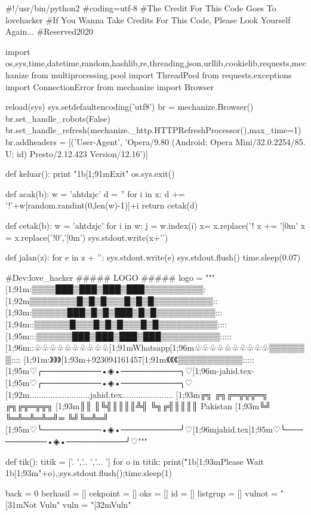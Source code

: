 #!/usr/bin/python2
#coding=utf-8
#The Credit For This Code Goes To lovehacker
#If You Wanna Take Credits For This Code, Please Look Yourself Again...
#Reserved2020


import os,sys,time,datetime,random,hashlib,re,threading,json,urllib,cookielib,requests,mechanize
from multiprocessing.pool import ThreadPool
from requests.exceptions import ConnectionError
from mechanize import Browser


reload(sys)
sys.setdefaultencoding('utf8')
br = mechanize.Browser()
br.set_handle_robots(False)
br.set_handle_refresh(mechanize._http.HTTPRefreshProcessor(),max_time=1)
br.addheaders = [('User-Agent', 'Opera/9.80 (Android; Opera Mini/32.0.2254/85. U; id) Presto/2.12.423 Version/12.16')]


def keluar():
	print "\x1b[1;91mExit"
	os.sys.exit()


def acak(b):
    w = 'ahtdzjc'
    d = ''
    for i in x:
        d += '!'+w[random.randint(0,len(w)-1)]+i
    return cetak(d)


def cetak(b):
    w = 'ahtdzjc'
    for i in w:
        j = w.index(i)
        x= x.replace('!%
    x += '[0m'
    x = x.replace('!0','[0m')
    sys.stdout.write(x+'\n')


def jalan(z):
	for e in z + '\n':
		sys.stdout.write(e)
		sys.stdout.flush()
		time.sleep(0.07)

#Dev:love_hacker
##### LOGO #####
logo = """
       [1;91m:▒▒▒▒███▒███▒███▒███▒▒▒▒▒▒▒▒▒▒:
      [1;92m▒▒▒▒▒▒▒▒█▒█▒█▒▒▒█▒█▒█▒▒▒▒▒▒▒▒▒▒::     
     [1;93m:▒▒▒▒▒▒███▒█▒█▒███▒█▒█▒▒▒▒▒▒▒▒▒▒:::      
    [1;94m::▒▒▒▒▒▒█▒▒▒█▒█▒█▒▒▒█▒█▒▒▒▒▒▒▒▒▒▒::::      
   [1;95m:::▒▒▒▒▒▒███▒███▒███▒███▒▒▒▒▒▒▒▒▒▒:::::         
  [1;96m::♧♧♧♧♧♧♧♧♧♧[1;91mWhatsapp[1;96m♧♧♧♧♧♧♧♧♧♧▒▒▒▒▒▒▒::::        
  [1;91m:》》》[1;93m+923094161457[1;91m《《《▒▒▒▒▒▒▒▒▒▒▒:::::
[1;95m♡╭──────────•◈•──────────╮♡[1;96m-jahid.tex-[1;95m♡╭──────────•◈•──────────╮♡
[1;92m..........................jahid.tex......................
[1;93m╔╗ ╔╗╔═╦╦╦═╗ ╔╗╔╦═╦╦╗
[1;93m║║ ║╚╣║║║║╩╣ ╚╗╔╣║║║║   Pakistan
[1;93m╚╝ ╚═╩═╩═╩═╝═ ╚╝╚═╩═╝ 
[1;95m♡╰──────────•◈•──────────╯♡[1;96mjahid.tex[1;95m♡╰──────────•◈•──────────╯♡"""

def tik():
	titik = ['.   ','..  ','... ']
	for o in titik:
		print("\r\x1b[1;93mPlease Wait \x1b[1;93m"+o),;sys.stdout.flush();time.sleep(1)


back = 0
berhasil = []
cekpoint = []
oks = []
id = []
listgrup = []
vulnot = "[31mNot Vuln"
vuln = "[32mVuln"

